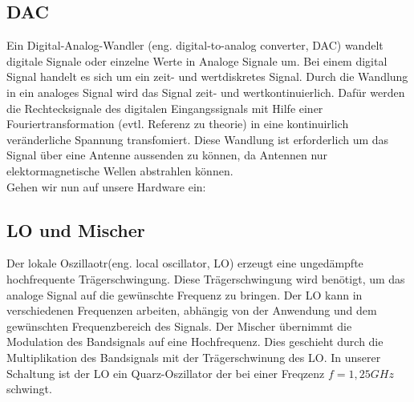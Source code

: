 \subsection{DAC}
Ein Digital-Analog-Wandler (eng. digital-to-analog converter, DAC) wandelt digitale Signale oder einzelne Werte in Analoge
Signale um. Bei einem digital Signal handelt es sich um ein zeit- und wertdiskretes Signal. Durch die Wandlung
in ein analoges Signal wird das Signal zeit- und wertkontinuierlich.  Dafür werden die Rechtecksignale des digitalen Eingangssignals mit Hilfe einer Fouriertransformation (evtl. Referenz zu theorie)
in eine  kontinuirlich veränderliche Spannung transfomiert. Diese Wandlung ist erforderlich um das Signal über eine
Antenne aussenden zu können, da Antennen nur elektormagnetische Wellen abstrahlen können. \\
Gehen wir nun auf unsere Hardware ein:
\\

\subsection{LO und Mischer}
Der lokale Oszillaotr(eng. local oscillator, LO) erzeugt eine ungedämpfte hochfrequente Trägerschwingung. Diese Trägerschwingung 
wird benötigt, um das analoge Signal auf die gewünschte Frequenz zu bringen. Der LO kann in verschiedenen Frequenzen arbeiten,
abhängig von der Anwendung und dem gewünschten Frequenzbereich des Signals. Der Mischer übernimmt die Modulation des
Bandsignals auf eine Hochfrequenz. Dies geschieht durch die Multiplikation des Bandsignals mit der Trägerschwinung des LO.
In unserer Schaltung ist der LO ein Quarz-Oszillator der bei einer Freqzenz $f=1,25GHz$ schwingt.


